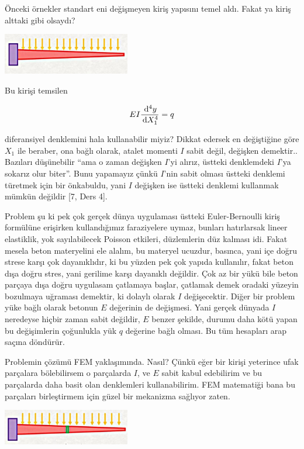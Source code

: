 \documentclass[12pt,fleqn]{article}\usepackage{../../common}
\begin{document}
Önceki örnekler standart eni değişmeyen kiriş yapısını temel aldı.  Fakat ya
kiriş alttaki gibi olsaydı?

\includegraphics[width=15em]{compscieng_bpp45fem2_01.jpg}

Bu kirişi temsilen

$$
E I \frac{\,\mathrm{d}^4 y}{\,\mathrm{d} X_1^4} = q
$$

diferansiyel denklemini hala kullanabilir miyiz? Dikkat edersek en değiştiğine
göre $X_1$ ile beraber, ona bağlı olarak, atalet momenti $I$ sabit değil,
değişken demektir.. Bazıları düşünebilir ``ama o zaman değişken $I$'yi alırız,
üstteki denklemdeki $I$'ya sokarız olur biter''. Bunu yapamayız çünkü $I$'nin
sabit olması üstteki denklemi türetmek için bir önkabuldu, yani $I$ değişken ise
üstteki denklemi kullanmak mümkün değildir [7, Ders 4].

Problem şu ki pek çok gerçek dünya uygulaması üstteki Euler-Bernoulli kiriş
formülüne erişirken kullandığımız faraziyelere uymaz, bunları hatırlarsak lineer
elastiklik, yok sayılabilecek Poisson etkileri, düzlemlerin düz kalması idi.
Fakat mesela beton materyelini ele alalım, bu materyel ucuzdur, basınca, yani
içe doğru strese karşı çok dayanıklıdır, ki bu yüzden pek çok yapıda kullanılır,
fakat beton dışa doğru stres, yani gerilime karşı dayanıklı değildir. Çok az bir
yükü bile beton parçaya dışa doğru uygulasam çatlamaya başlar, çatlamak demek
oradaki yüzeyin bozulmaya uğraması demektir, ki dolaylı olarak $I$
değişecektir. Diğer bir problem yüke bağlı olarak betonun $E$ değerinin de
değişmesi. Yani gerçek dünyada $I$ neredeyse hiçbir zaman sabit değildir, $E$
benzer şekilde, durumu daha kötü yapan bu değişimlerin çoğunlukla yük $q$
değerine bağlı olması. Bu tüm hesapları arap saçına döndürür.

Problemin çözümü FEM yaklaşımında. Nasıl? Çünkü eğer bir kirişi yeterince ufak
parçalara bölebilirsem o parçalarda $I$, ve $E$ sabit kabul edebilirim ve bu
parçalarda daha basit olan denklemleri kullanabilirim. FEM matematiği bana bu
parçaları birleştirmem için güzel bir mekanizma sağlıyor zaten.

\includegraphics[width=15em]{compscieng_bpp45fem2_02.jpg}
\end{document}
